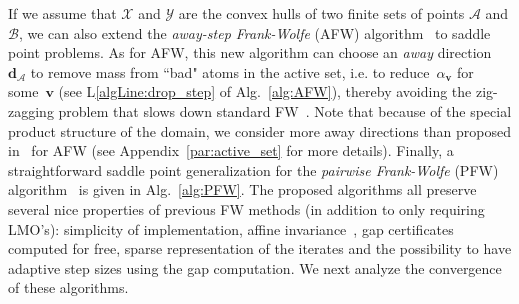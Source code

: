 \documentclass[twoside]{article}
\newcommand{\X}{\mathcal{X}}
\newcommand{\Y}{\mathcal{Y}}
\newcommand{\dd}{\bm{d}}
\newcommand{\vv}{\bm{v}} %
\newcommand{\A}{\mathcal{A}}
\newcommand{\B}{\mathcal{B}}
\newcommand{\0}{\mathbf{0}} %
\begin{document}
If we assume that $\X$ and $\Y$ are the convex hulls of two finite sets of points $\A$ and $\B$, we can also extend the {\em away-step Frank-Wolfe} (AFW) algorithm~\citep{Guelat1986AFW,lacoste2015global} to saddle point problems.
As for AFW, this new algorithm can choose an \emph{away} direction~$\dd_\A$ to remove mass from ``bad" atoms in the active set, i.e. to reduce~$\alpha_{\vv}$ for some~$\vv$ (see L\ref{algLine:drop_step} of Alg.~\ref{alg:AFW}),
%
thereby avoiding the zig-zagging problem that slows down standard FW~\citep{lacoste2015global}. Note that because of the special product structure of the domain, we consider more away directions than proposed in~\citep{lacoste2015global} for AFW (see Appendix~\ref{par:active_set} for more details). Finally, a straightforward saddle point generalization for the {\em pairwise Frank-Wolfe} (PFW) algorithm~\citep{lacoste2015global} is given in Alg.~\ref{alg:PFW}.
%
%
%
The proposed algorithms all preserve several nice properties of previous FW methods (in addition to only requiring LMO's): simplicity of implementation, affine invariance~\citep{jaggi2013revisiting}, gap certificates computed for free, sparse representation of the iterates {and the possibility to have adaptive step sizes using the gap computation.
We next analyze the convergence of these algorithms.}



%
%
%

%
%
\end{document}
